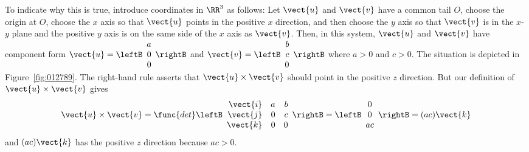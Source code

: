 \noindent To indicate why this is true, introduce coordinates in $\RR^3$ as follows: Let $\vect{u}$ and $\vect{v}$ have a common tail $O$, choose the origin at $O$, choose the $x$ axis so that $\vect{u}$ points in the positive $x$ direction, and then choose the $y$ axis so that $\vect{v}$ is in the $x$-$y$ plane and the positive $y$ axis is on the same side of the $x$ axis as $\vect{v}$. Then, in this system, $\vect{u}$ and $\vect{v}$ have component form 
$\vect{u} = \leftB
\begin{array}{r}
a\\
0\\
0
\end{array}
\rightB$
and 
$\vect{v} = \leftB
\begin{array}{r}
b\\
c\\
0
\end{array}
\rightB$
 where $a > 0$ and $c > 0$. The situation is depicted in Figure~\ref{fig:012789}. The right-hand rule asserts that $\vect{u} \times \vect{v}$ should point in the positive $z$ direction. But our definition of $\vect{u} \times \vect{v}$ gives
\begin{equation*}
\vect{u} \times \vect{v} = \func{det}\leftB
\begin{array}{rrr}
\vect{i} & a & b\\
\vect{j} & 0 & c\\
\vect{k} & 0 & 0
\end{array}
\rightB = 
\leftB
\begin{array}{c}
0\\
0\\
ac
\end{array}
\rightB = (ac)\vect{k}
\end{equation*}
and $(ac) \vect{k}$ has the positive $z$ direction because $ac > 0$.
